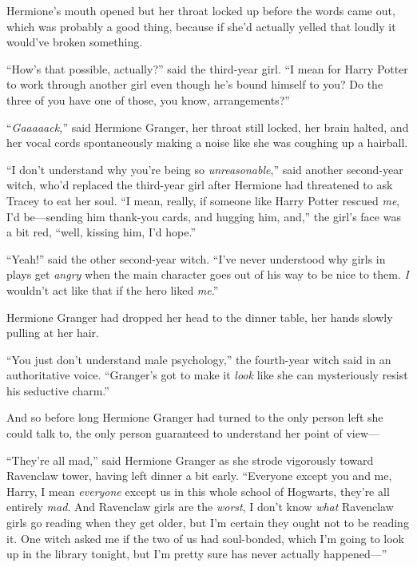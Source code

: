Hermione’s mouth opened but her throat locked up before the words came out, which was probably a good thing, because if she’d actually yelled that loudly it would’ve broken something.

“How’s that possible, actually?” said the third-year girl.
“I mean for Harry Potter to work through another girl even though he’s bound himself to you? Do the three of you have one of those, you know, arrangements?”

“\emph{Gaaaaack,}” said Hermione Granger, her throat still locked, her brain halted, and her vocal cords spontaneously making a noise like she was coughing up a hairball.


“I don’t understand why you’re being so \emph{unreasonable},” said another second-year witch, who’d replaced the third-year girl after Hermione had threatened to ask Tracey to eat her soul.
“I mean, really, if someone like Harry Potter rescued \emph{me}, I’d be—sending him thank-you cards, and hugging him, and,” the girl’s face was a bit red, “well, kissing him, I’d hope.”

“Yeah!” said the other second-year witch.
“I’ve never understood why girls in plays get \emph{angry} when the main character goes out of his way to be nice to them. \emph{I} wouldn’t act like that if the hero liked \emph{me}.”

Hermione Granger had dropped her head to the dinner table, her hands slowly pulling at her hair.

“You just don’t understand male psychology,” the fourth-year witch said in an authoritative voice.
“Granger’s got to make it \emph{look} like she can mysteriously resist his seductive charm.”


And so before long Hermione Granger had turned to the only person left she could talk to, the only person guaranteed to understand her point of view—

“They’re all mad,” said Hermione Granger as she strode vigorously toward Ravenclaw tower, having left dinner a bit early.
“Everyone except you and me, Harry, I mean \emph{everyone} except us in this whole school of Hogwarts, they’re all entirely \emph{mad}. And Ravenclaw girls are the \emph{worst}, I don’t know \emph{what} Ravenclaw girls go reading when they get older, but I’m certain they ought not to be reading it. One witch asked me if the two of us had soul-bonded, which I’m going to look up in the library tonight, but I’m pretty sure has never actually happened—”

